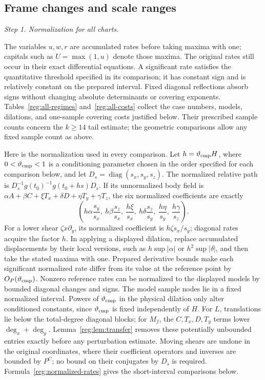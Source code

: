 \documentclass[11pt]{amsart}
\theoremstyle{definition}
\theoremstyle{remark}
\numberwithin{equation}{section}
\begin{document}
\subsection{Frame changes and scale ranges}\label{reg:gauges}\label{reg:geometric-regimes}
\par\medskip\noindent\textit{Step 1. Normalization for all charts.}\par\nobreak\smallskip

The variables $u,w,r$ are accumulated rates before taking maxima with one; capitals such as $U=\max(1,u)$ denote those maxima. The original rates still occur in their exact differential equations. A significant rate satisfies the quantitative threshold specified in its comparison; it has constant sign and is relatively constant on the prepared interval. Fixed diagonal reflections absorb signs without changing absolute determinants or covering exponents. Tables~\ref{reg:all-regimes} and~\ref{reg:all-costs} collect the case numbers, models, dilations, and one-sample covering costs justified below. Their prescribed sample counts concern the $k\ge14$ tail estimate; the geometric comparisons allow any fixed sample count as above.

Here is the normalization used in every comparison. Let $h=\vartheta_{\rm cmp} H$, where $0<\vartheta_{\rm cmp}<1$ is a conditioning parameter chosen in the order specified for each comparison below, and let $D_s=\operatorname{diag}(s_x,s_y,s_z)$. The normalized relative path is $D_s^{-1}g(t_0)^{-1}g(t_0+hs)D_s$. If its unnormalized body field is $\alpha A+\beta C+\xi T_x+\delta D+\eta T_y+\gamma T_z$, the six normalized coefficients are exactly
\begin{equation}\label{reg:normalized-rates}
\left(h\alpha\frac{s_y}{s_x},\ h\beta\frac{s_z}{s_x},\ \frac{h\xi}{s_x},\ h\delta\frac{s_z}{s_y},\ \frac{h\eta}{s_y},\ \frac{h\gamma}{s_z}\right).
\end{equation}
For a lower shear $\zeta x\partial_y$, its normalized coefficient is $h\zeta s_x/s_y$; diagonal rates acquire the factor $h$. In applying a displayed dilation, replace accumulated displacements by their local versions, such as $h\sup|\alpha|$ or $h^2\sup|\delta|$, and then take the stated maxima with one. Prepared derivative bounds make each significant normalized rate differ from its value at the reference point by $O_P(\vartheta_{\rm cmp})$. Nonzero reference rates can be normalized to the displayed models by bounded diagonal changes and signs. The model sample nodes lie in a fixed normalized interval. Powers of $\vartheta_{\rm cmp}$ in the physical dilation only alter conditioned constants, since $\vartheta_{\rm cmp}$ is fixed independently of $H$. For $L$, translations lie below the total-degree diagonal blocks; for $M_f$, the $C,T_x,D,T_y$ terms lower $\deg_x+\deg_y$. Lemma~\ref{reg:lem:transfer} removes these potentially unbounded entries exactly before any perturbation estimate. Moving shears are undone in the original coordinates, where their coefficient operators and inverses are bounded by $P^C$; no bound on their conjugates by $D_s$ is required. Formula~\eqref{reg:normalized-rates} gives the short-interval comparisons below.
\end{document}

